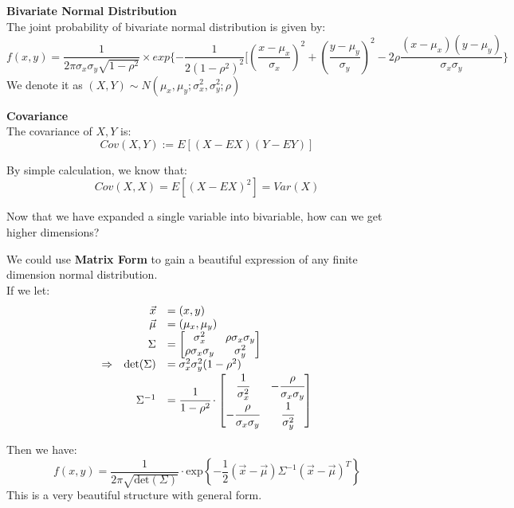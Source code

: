 \documentclass{article}
\begin{document}
\begin{definition}
    \textbf{Bivariate Normal Distribution}\\
    The joint probability of bivariate normal distribution is given by:
    $$ f(x,y) = \frac{1}{2\pi \sigma_x\sigma_y\sqrt{1-\rho^2}} \times exp\{-\frac{1}{2(1-\rho^2)^2}[(\frac{x-\mu_x}{\sigma_x})^2 + (\frac{y - \mu_y}{\sigma_y})^2 - 2\rho\frac{(x - \mu_x)(y - \mu_y)}{\sigma_x\sigma_y}\}$$
    We denote it as $(X,Y) \sim N(\mu_x,\mu_y; \sigma^2_x,\sigma^2_y;\rho)$
\end{definition}

\begin{definition}
    \textbf{Covariance}\\
    The covariance of $X,Y$ is:
    $$ Cov(X,Y) := E[(X - EX)(Y - EY)]$$
\end{definition}
By simple calculation, we know that:
$$ Cov(X,X) = E[(X-EX)^2] = Var(X)$$

Now that we have expanded a single variable into bivariable, how can we get higher dimensions?

We could use \textbf{Matrix Form} to gain a beautiful expression of any finite dimension normal distribution.\\
If we let:
\begingroup
\renewcommand{\arraystretch}{1.5}
\[
\begin{array}{lrl}
            & \vec{x} &= (x,y)\\
            & \vec{\mu} &= (\mu_{x}, \mu_{y})\\
            & \Sigma &= 
                    \begin{bmatrix}
                        \sigma_{x}^{2} & \rho \sigma_{x}\sigma_{y} \\
                        \rho \sigma_{x}\sigma_{y} & \sigma_{y}^{2}
                    \end{bmatrix}\\
\Rightarrow & \text{det}(\Sigma) &= \sigma_{x}^{2} \sigma_{y}^{2} (1-\rho^{2})\\
            & \Sigma^{-1} &= \cfrac{1}{1-\rho^{2}} \cdot
                    \begin{bmatrix}
                        \cfrac{1}{\sigma_{x}^{2}} & - \cfrac{\rho}{\sigma_{x} \sigma_{y}}\\
                        - \cfrac{\rho}{\sigma_{x} \sigma_{y}} & \cfrac{1}{\sigma_{y}^{2}}
                    \end{bmatrix}
\end{array}
\]
\endgroup

Then we have:
\[
f(x,y) = \frac{1}{2\pi \sqrt{\text{det}(\Sigma)}} \cdot \text{exp} \left\{ -\frac{1}{2} (\vec{x} - \vec{\mu}) \Sigma^{-1} (\vec{x} - \vec{\mu})^{T}  \right\}
\]
This is a very beautiful structure with general form.
\end{document}
